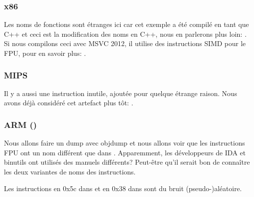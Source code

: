 

\subsubsection{x86}



Les noms de fonctions sont étranges ici car cet exemple a été compilé en tant que
C++ et ceci est la modification des noms en C++, nous en parlerons plus loin: .
Si nous compilons ceci avec MSVC 2012, il utilise des instructions SIMD pour le FPU,
pour en savoir plus: .

\subsubsection{MIPS}



Il y a aussi une instruction  inutile, ajoutée pour quelque étrange raison.
Nous avons déjà considéré cet artefact plus tôt: .

\subsubsection{ARM (\ARMMode)}




Nous allons faire un dump avec objdump et nous allons voir que les instructions FPU
ont un nom différent que dans \IDA.
Apparemment, les développeurs de IDA et binutils ont utilisés des manuels différents?
Peut-être qu'il serait bon de connaître les deux variantes de noms des instructions.



Les instructions en 0x5c dans  et en 0x38 dans \main sont du bruit
(pseudo-)aléatoire.

